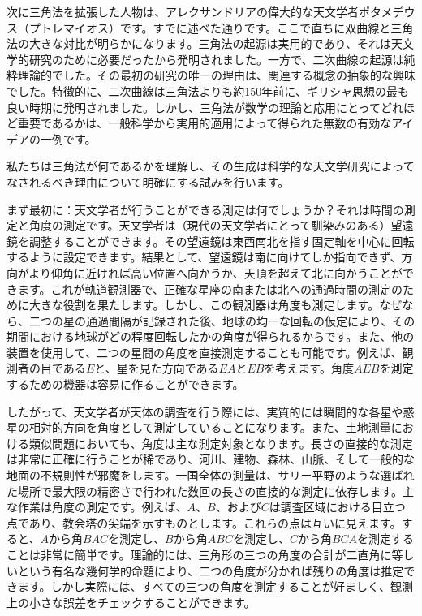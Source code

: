 \documentclass[a4paper,11pt,openany]{ltjsbook}
\begin{document}
次に三角法を拡張した人物は、アレクサンドリアの偉大的な天文学者ポタメデウス（プトレマイオス）です。すでに述べた通りです。ここで直ちに双曲線と三角法の大きな対比が明らかになります。三角法の起源は実用的であり、それは天文学的研究のために必要だったから発明されました。一方で、二次曲線の起源は純粋理論的でした。その最初の研究の唯一の理由は、関連する概念の抽象的な興味でした。特徴的に、二次曲線は三角法よりも約150年前に、ギリシャ思想の最も良い時期に発明されました。しかし、三角法が数学の理論と応用にとってどれほど重要であるかは、一般科学から実用的適用によって得られた無数の有効なアイデアの一例です。

私たちは三角法が何であるかを理解し、その生成は科学的な天文学研究によってなされるべき理由について明確にする試みを行います。

まず最初に：天文学者が行うことができる測定は何でしょうか？それは時間の測定と角度の測定です。天文学者は（現代の天文学者にとって馴染みのある）望遠鏡を調整することができます。その望遠鏡は東西南北を指す固定軸を中心に回転するように設定できます。結果として、望遠鏡は南に向けてしか指向できず、方向がより仰角に近ければ高い位置へ向かうか、天頂を超えて北に向かうことができます。これが軌道観測器で、正確な星座の南または北への通過時間の測定のために大きな役割を果たします。しかし、この観測器は角度も測定します。なぜなら、二つの星の通過間隔が記録された後、地球の均一な回転の仮定により、その期間における地球がどの程度回転したかの角度が得られるからです。また、他の装置を使用して、二つの星間の角度を直接測定することも可能です。例えば、観測者の目である$E$と、星を見た方向である$EA$と$EB$を考えます。角度$AEB$を測定するための機器は容易に作ることができます。

したがって、天文学者が天体の調査を行う際には、実質的には瞬間的な各星や惑星の相対的方向を角度として測定していることになります。また、土地測量における類似問題においても、角度は主な測定対象となります。長さの直接的な測定は非常に正確に行うことが稀であり、河川、建物、森林、山脈、そして一般的な地面の不規則性が邪魔をします。一国全体の測量は、サリー平野のような選ばれた場所で最大限の精密さで行われた数回の長さの直接的な測定に依存します。主な作業は角度の測定です。例えば、$A$、$B$、および$C$は調査区域における目立つ点であり、教会塔の尖端を示すものとします。これらの点は互いに見えます。すると、$A$から角$BAC$を測定し、$B$から角$ABC$を測定し、$C$から角$BCA$を測定することは非常に簡単です。理論的には、三角形の三つの角度の合計が二直角に等しいという有名な幾何学的命題により、二つの角度が分かれば残りの角度は推定できます。しかし実際には、すべての三つの角度を測定することが好ましく、観測上の小さな誤差をチェックすることができます。
\end{document}

